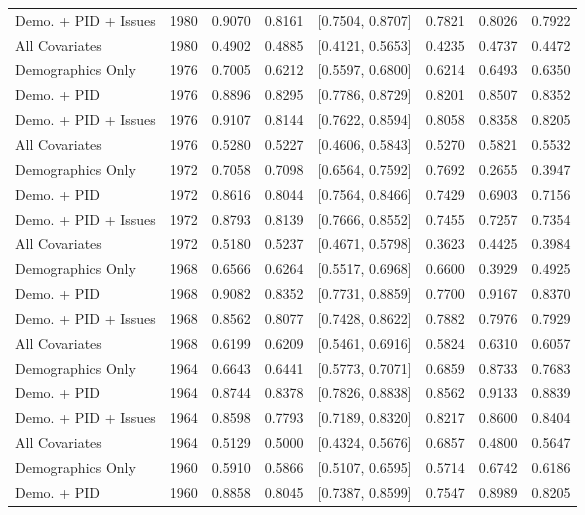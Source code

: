 \begin{longtable}{lrrrlrrr}
  Demo. + PID + Issues & 1980 & 0.9070 & 0.8161 & [0.7504, 0.8707] & 0.7821 & 0.8026 & 0.7922 \\ 
  All Covariates & 1980 & 0.4902 & 0.4885 & [0.4121, 0.5653] & 0.4235 & 0.4737 & 0.4472 \\ 
  Demographics Only & 1976 & 0.7005 & 0.6212 & [0.5597, 0.6800] & 0.6214 & 0.6493 & 0.6350 \\ 
  Demo. + PID & 1976 & 0.8896 & 0.8295 & [0.7786, 0.8729] & 0.8201 & 0.8507 & 0.8352 \\ 
  Demo. + PID + Issues & 1976 & 0.9107 & 0.8144 & [0.7622, 0.8594] & 0.8058 & 0.8358 & 0.8205 \\ 
  All Covariates & 1976 & 0.5280 & 0.5227 & [0.4606, 0.5843] & 0.5270 & 0.5821 & 0.5532 \\ 
  Demographics Only & 1972 & 0.7058 & 0.7098 & [0.6564, 0.7592] & 0.7692 & 0.2655 & 0.3947 \\ 
  Demo. + PID & 1972 & 0.8616 & 0.8044 & [0.7564, 0.8466] & 0.7429 & 0.6903 & 0.7156 \\ 
  Demo. + PID + Issues & 1972 & 0.8793 & 0.8139 & [0.7666, 0.8552] & 0.7455 & 0.7257 & 0.7354 \\ 
  All Covariates & 1972 & 0.5180 & 0.5237 & [0.4671, 0.5798] & 0.3623 & 0.4425 & 0.3984 \\ 
  Demographics Only & 1968 & 0.6566 & 0.6264 & [0.5517, 0.6968] & 0.6600 & 0.3929 & 0.4925 \\ 
  Demo. + PID & 1968 & 0.9082 & 0.8352 & [0.7731, 0.8859] & 0.7700 & 0.9167 & 0.8370 \\ 
  Demo. + PID + Issues & 1968 & 0.8562 & 0.8077 & [0.7428, 0.8622] & 0.7882 & 0.7976 & 0.7929 \\ 
  All Covariates & 1968 & 0.6199 & 0.6209 & [0.5461, 0.6916] & 0.5824 & 0.6310 & 0.6057 \\ 
  Demographics Only & 1964 & 0.6643 & 0.6441 & [0.5773, 0.7071] & 0.6859 & 0.8733 & 0.7683 \\ 
  Demo. + PID & 1964 & 0.8744 & 0.8378 & [0.7826, 0.8838] & 0.8562 & 0.9133 & 0.8839 \\ 
  Demo. + PID + Issues & 1964 & 0.8598 & 0.7793 & [0.7189, 0.8320] & 0.8217 & 0.8600 & 0.8404 \\ 
  All Covariates & 1964 & 0.5129 & 0.5000 & [0.4324, 0.5676] & 0.6857 & 0.4800 & 0.5647 \\ 
  Demographics Only & 1960 & 0.5910 & 0.5866 & [0.5107, 0.6595] & 0.5714 & 0.6742 & 0.6186 \\ 
  Demo. + PID & 1960 & 0.8858 & 0.8045 & [0.7387, 0.8599] & 0.7547 & 0.8989 & 0.8205 \\ 

\end{longtable}
